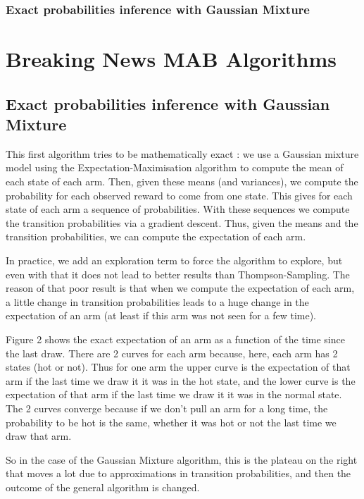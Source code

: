 \documentclass[french]{beamer}
\begin{document}
\begin{frame}
	\frametitle{Exact probabilities inference with Gaussian Mixture}
	\section{Breaking News MAB Algorithms}
	\subsection{Exact probabilities inference with Gaussian Mixture}
	
	This first algorithm tries to be mathematically exact : we use a Gaussian mixture model using the Expectation-Maximisation algorithm to compute the mean of each state of each arm. Then, given these means (and variances), we compute the probability for each observed reward to come from one state. This gives for each state of each arm a sequence of probabilities. With these sequences we compute the transition probabilities via a gradient descent. Thus, given the means and the transition probabilities, we can compute the expectation of each arm.
	\newline
	
	In practice, we add an exploration term to force the algorithm to explore, but even with that it does not lead to better results than Thompson-Sampling. The reason of that poor result is that when we compute the expectation of each arm, a little change in transition probabilities leads to a huge change in the expectation of an arm (at least if this arm was not seen for a few time).
	
	Figure 2 shows the exact expectation of an arm as a function of the time since the last draw. There are 2 curves for each arm because, here, each arm has 2 states (hot or not). Thus for one arm the upper curve is the expectation of that arm if the last time we draw it it was in the hot state, and the lower curve is the expectation of that arm if the last time we draw it it was in the normal state. The 2 curves converge because if we don't pull an arm for a long time, the probability to be hot is the same, whether it was hot or not the last time we draw that arm.
	
	So in the case of the Gaussian Mixture algorithm, this is the plateau on the right that moves a lot due to approximations in transition probabilities, and then the outcome of the general algorithm is changed.
	

\end{frame}
\end{document}

